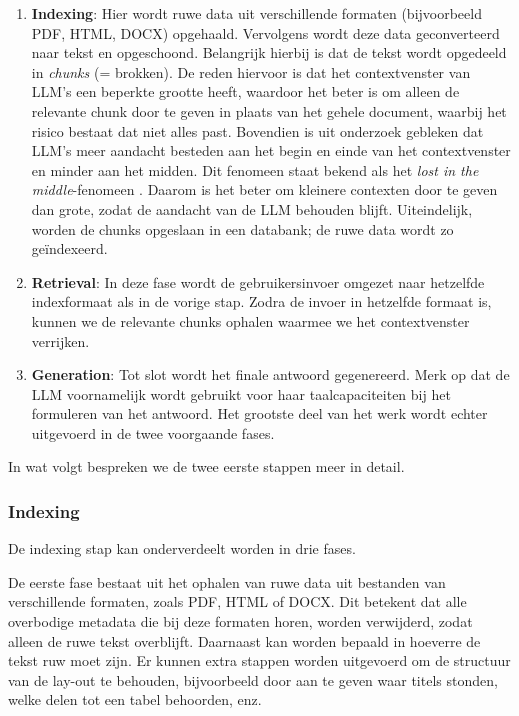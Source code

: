 \begin{enumerate} 
    \item \textbf{Indexing}: Hier wordt ruwe data uit verschillende formaten (bijvoorbeeld PDF, HTML, DOCX) opgehaald. Vervolgens wordt deze data geconverteerd naar tekst en opgeschoond. Belangrijk hierbij is dat de tekst wordt opgedeeld in \emph{chunks} (= brokken). De reden hiervoor is dat het contextvenster van LLM's een beperkte grootte heeft, waardoor het beter is om alleen de relevante chunk door te geven in plaats van het gehele document, waarbij het risico bestaat dat niet alles past. Bovendien is uit onderzoek gebleken dat LLM's meer aandacht besteden aan het begin en einde van het contextvenster en minder aan het midden. Dit fenomeen staat bekend als het \emph{lost in the middle}-fenomeen \autocite{Databricks}. Daarom is het beter om kleinere contexten door te geven dan grote, zodat de aandacht van de LLM behouden blijft. Uiteindelijk, worden de chunks opgeslaan in een databank; de ruwe data wordt zo geïndexeerd. 
    \item \textbf{Retrieval}: In deze fase wordt de gebruikersinvoer omgezet naar hetzelfde indexformaat als in de vorige stap. Zodra de invoer in hetzelfde formaat is, kunnen we de relevante chunks ophalen waarmee we het contextvenster verrijken.   
    \item \textbf{Generation}: Tot slot wordt het finale antwoord gegenereerd. Merk op dat de \acrshort{LLM} voornamelijk wordt gebruikt voor haar taalcapaciteiten bij het formuleren van het antwoord. Het grootste deel van het werk wordt echter uitgevoerd in de twee voorgaande fases.
\end{enumerate}

In wat volgt bespreken we de twee eerste stappen meer in detail.

\subsubsection{Indexing}%
\label{subsubsec:indexing}

De indexing stap kan onderverdeelt worden in drie fases.

De eerste fase bestaat uit het ophalen van ruwe data uit bestanden van verschillende formaten, zoals PDF, HTML of DOCX. Dit betekent dat alle overbodige metadata die bij deze formaten horen, worden verwijderd, zodat alleen de ruwe tekst overblijft. Daarnaast kan worden bepaald in hoeverre de tekst ruw moet zijn. Er kunnen extra stappen worden uitgevoerd om de structuur van de lay-out te behouden, bijvoorbeeld door aan te geven waar titels stonden, welke delen tot een tabel behoorden, enz.

